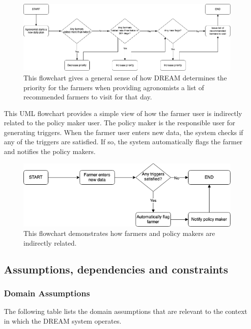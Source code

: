 \begin{figure}[hbt!]
\centering
\includegraphics[scale=0.4]{../images_diagrams/adjustvisitpriority.png}
\caption{\label{fig:addOne{figure_counter}}This flowchart gives a general sense of how DREAM determines the priority for the farmers when providing agronomists a list of recommended farmers to visit for that day.}
\end{figure}

\newpage

\begin{flushleft}
This UML flowchart provides a simple view of how the farmer user is indirectly related to the policy maker user. The policy maker is the responsible user for generating triggers. When the farmer user enters new data, the system checks if any of the triggers are satisfied. If so, the system automatically flags the farmer and notifies the policy makers. 
\end{flushleft}


\begin{figure}[hbt!]
\centering
\includegraphics[scale=0.4]{../images_diagrams/newfarmerdata_trigger.png}
\caption{\label{fig:addOne{figure_counter}}This flowchart demonstrates how farmers and policy makers are indirectly related.}

\end{figure}


\subsection{Assumptions, dependencies and constraints}
\subsubsection{Domain Assumptions}
\begin{flushleft}
The following table lists the domain assumptions that are relevant to the context in which the DREAM system operates. 
\end{flushleft} 

\begin{flushleft}

\end{flushleft}

